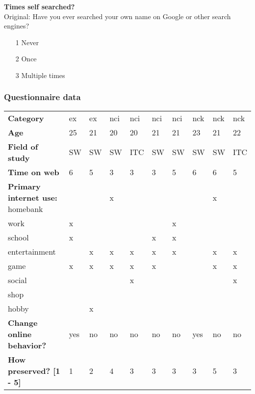 \noindent\textbf{Times self searched?} \hfill \\
Original: Have you ever searched your own name on Google or other search engines?
\begin{itemize}
    \item[1] Never
    \item[2] Once
    \item[3] Multiple times
\end{itemize}

\subsubsection{Questionnaire data}
\begin{table}
    \centering
    \begin{tabular}{llllllllll}
    \textbf{Category} & ex  & ex    & nci   & nci   & nci     & nci   & nck  & nck & nck \\
    \textbf{Age} & 25  & 21    & 20    & 20    & 21      & 21    & 23   & 21  & 22  \\
    \textbf{Field of study} & SW  & SW  & SW    & ITC   & SW  & SW    & SW   & SW  & ITC \\
    \textbf{Time on web} & 6   & 5     & 3     & 3     & 3       & 5     & 6    & 6   & 5   \\
    \textbf{Primary internet use:}
    homebank        &     &       & x     &       &         &       &      & x   &     \\
    work            & x   &       &       &       &         & x     &      &     &     \\
    school          & x   &       &       &       & x       & x     &      &     &     \\
    entertainment   &     & x     & x     & x     & x       & x     &      & x   & x   \\
    game            & x   & x     & x     & x     & x       &       &      & x   & x   \\
    social          &     &       &       & x     &         &       &      &     & x   \\
    shop            &     &       &       &       &         &       &      &     &     \\
    hobby           &     & x     &       &       &         &       &      &     &     \\
    \textbf{Change online behavior?} & yes & no    & no    & no    & no      & no    & yes  & no  & no  \\
    \textbf{How preserved? [1 - 5]} & 1   & 2     & 4     & 3     & 3       & 3     & 3    & 5   & 3   \\

\end{tabular}
\end{table}
